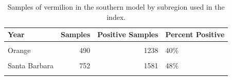 \documentclass[
  english,
  a4paper,
]{article}
\begin{document}
\FloatBarrier

\begin{table}

\caption{\label{tab:tab-region-cpfvonboard}Samples of vermilion in the southern model by subregion used in the index.}
\centering
\begin{tabular}[t]{lrrl}
\toprule
Year & Samples & Positive Samples & Percent Positive\\
\midrule
\cellcolor{gray!6}{Los Angeles} & \cellcolor{gray!6}{1865} & \cellcolor{gray!6}{4319} & \cellcolor{gray!6}{43\%}\\
Orange & 490 & 1238 & 40\%\\
\cellcolor{gray!6}{San Diego} & \cellcolor{gray!6}{1152} & \cellcolor{gray!6}{2408} & \cellcolor{gray!6}{48\%}\\
Santa Barbara & 752 & 1581 & 48\%\\
\cellcolor{gray!6}{Ventura} & \cellcolor{gray!6}{1701} & \cellcolor{gray!6}{4672} & \cellcolor{gray!6}{36\%}\\
\bottomrule
\end{tabular}
\end{table}
\end{document}
